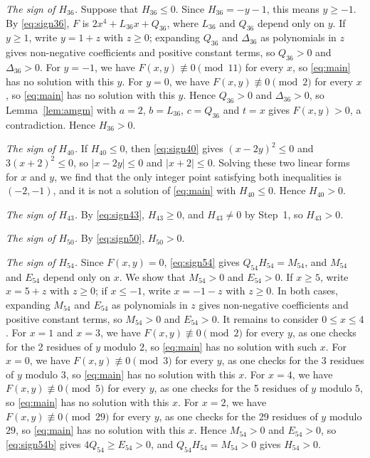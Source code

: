 \documentclass[11pt]{article}
\begin{document}
\emph{The sign of $H_{36}$.} Suppose that $H_{36}\leq0$. Since $H_{36}=-y-1$, this means $y\geq-1$. By \eqref{eq:sign36}, $F$ is $2x^4+L_{36}x+Q_{36}$, where $L_{36}$ and $Q_{36}$ depend only on $y$. If $y\geq1$, write $y=1+z$ with $z\geq0$; expanding $Q_{36}$ and $\Delta_{36}$ as polynomials in $z$ gives non-negative coefficients and positive constant terms, so $Q_{36}>0$ and $\Delta_{36}>0$. For $y=-1$, we have $F(x,y)\not\equiv0\pmod{11}$ for every $x$, so \eqref{eq:main} has no solution with this $y$. For $y=0$, we have $F(x,y)\not\equiv0\pmod{2}$ for every $x$, so \eqref{eq:main} has no solution with this $y$. Hence $Q_{36}>0$ and $\Delta_{36}>0$, so Lemma~\ref{lem:amgm} with $a=2$, $b=L_{36}$, $c=Q_{36}$ and $t=x$ gives $F(x,y)>0$, a contradiction. Hence $H_{36}>0$.

\emph{The sign of $H_{40}$.} If $H_{40}\leq0$, then \eqref{eq:sign40} gives $(x-2y)^2\leq 0$ and $3(x+2)^2\leq 0$, so $|x-2y|\leq0$ and $|x+2|\leq0$. Solving these two linear forms for $x$ and $y$, we find that the only integer point satisfying both inequalities is $(-2,-1)$, and it is not a solution of \eqref{eq:main} with $H_{40}\leq0$. Hence $H_{40}>0$.

\emph{The sign of $H_{43}$.} By \eqref{eq:sign43}, $H_{43}\geq0$, and $H_{43}\neq0$ by Step~1, so $H_{43}>0$.

\emph{The sign of $H_{50}$.} By \eqref{eq:sign50}, $H_{50}>0$.

\emph{The sign of $H_{54}$.} Since $F(x,y)=0$, \eqref{eq:sign54} gives $Q_{54}H_{54}=M_{54}$, and $M_{54}$ and $E_{54}$ depend only on $x$. We show that $M_{54}>0$ and $E_{54}>0$. If $x\geq5$, write $x=5+z$ with $z\geq0$; if $x\leq-1$, write $x=-1-z$ with $z\geq0$. In both cases, expanding $M_{54}$ and $E_{54}$ as polynomials in $z$ gives non-negative coefficients and positive constant terms, so $M_{54}>0$ and $E_{54}>0$. It remains to consider $0\leq x\leq4$. For $x=1$ and $x=3$, we have $F(x,y)\not\equiv0\pmod{2}$ for every $y$, as one checks for the 2 residues of $y$ modulo $2$, so \eqref{eq:main} has no solution with such $x$. For $x=0$, we have $F(x,y)\not\equiv0\pmod{3}$ for every $y$, as one checks for the 3 residues of $y$ modulo $3$, so \eqref{eq:main} has no solution with this $x$. For $x=4$, we have $F(x,y)\not\equiv0\pmod{5}$ for every $y$, as one checks for the 5 residues of $y$ modulo $5$, so \eqref{eq:main} has no solution with this $x$. For $x=2$, we have $F(x,y)\not\equiv0\pmod{29}$ for every $y$, as one checks for the 29 residues of $y$ modulo $29$, so \eqref{eq:main} has no solution with this $x$. Hence $M_{54}>0$ and $E_{54}>0$, so \eqref{eq:sign54b} gives $4Q_{54}\geq E_{54}>0$, and $Q_{54}H_{54}=M_{54}>0$ gives $H_{54}>0$.
\end{document}
